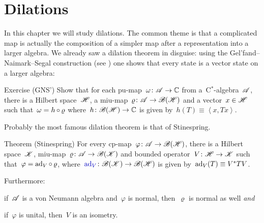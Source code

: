 \documentclass[b]{subfiles}
\begin{document}

\chapter{Dilations}

\begin{parsec}%
\begin{point}%
In this chapter we will study dilations.
The common theme is that a complicated map
    is actually the composition of a simpler map
    after a representation into a larger algebra.
We already saw a dilation theorem in disguise:
    using the Gel'fand--Naimark--Segal construction (see )
    one shows that every state is a vector state on a larger algebra:
\end{point}
\begin{point}{Exercise (GNS')}%
    Show that
    for each pu-map~$\omega\colon \mathscr{A} \to \mathbb{C}$
        from a~C$^*$-algebra~$\mathscr{A}$,
    there is a Hilbert space~$\mathscr{H}$,
    a miu-map~$\varrho\colon \mathscr{A} \to \mathscr{B}(\mathscr{H})$
    and a vector~$x \in \mathscr{H}$
    such that~$\omega = h \mathop{\circ} \varrho$
    where~$h \colon \mathscr{B}(\mathscr{H}) \to \mathbb{C}$
    is given by~$h(T) \equiv \left<x,Tx\right>$.
\end{point}

\begin{point}%
Probably the most famous dilation theorem is that
of Stinespring\cite[Thm.~1]{stinespring}.
\end{point}

\begin{point}{Theorem (Stinespring)}
    For every cp-map~$\varphi\colon \mathscr{A} \to \mathscr{B} (\mathscr{H})$,
    there is a Hilbert space~$\mathscr{K}$,
        miu-map~$\varrho\colon \mathscr{A} \to \mathscr{B}(\mathscr{K})$
        and bounded operator~$V\colon \mathscr{H} \to \mathscr{K}$
        such that~$\varphi = \mathrm{ad}_V \mathop{\circ} \varrho$,
        where~$\Define{\ad_V} \colon \scrB(\scrK) \to \scrB(\scrH)$
        is given by~$\mathrm{ad}_V(T)\equiv V^*TV$.

Furthermore:
\begin{inparaenum}
\item
    if~$\mathscr{A}$ is a von Neumann algebra
    and~$\varphi$ is normal, then~$\varrho$ is normal as well \emph{and}
\item
    if~$\varphi$ is unital, then~$V$ is an isometry.
\end{inparaenum}
\end{point}


\end{parsec}
\end{document}
